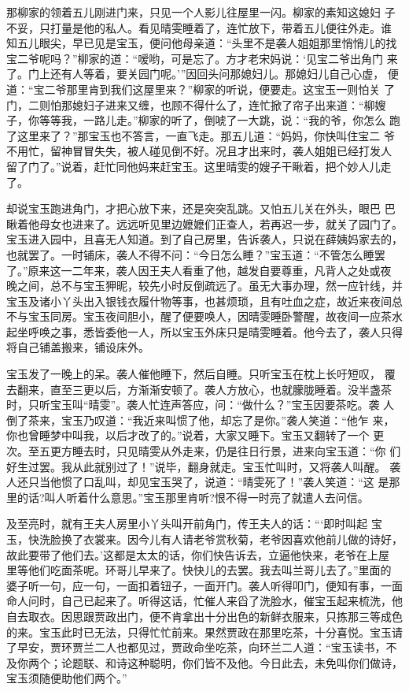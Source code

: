 那柳家的领着五儿刚进门来，只见一个人影儿往屋里一闪。柳家的素知这媳妇
子不妥，只打量是他的私人。看见晴雯睡着了，连忙放下，带着五儿便往外走。谁
知五儿眼尖，早已见是宝玉，便问他母亲道：“头里不是袭人姐姐那里悄悄儿的找
宝二爷呢吗？”柳家的道：“嗳哟，可是忘了。方才老宋妈说：‘见宝二爷出角门
来了。门上还有人等着，要关园门呢。’”因回头问那媳妇儿。那媳妇儿自己心虚，
便道：“宝二爷那里肯到我们这屋里来？”柳家的听说，便要走。这宝玉一则怕关
了门，二则怕那媳妇子进来又缠，也顾不得什么了，连忙掀了帘子出来道：“柳嫂
子，你等等我，一路儿走。”柳家的听了，倒唬了一大跳，说：“我的爷，你怎么
跑了这里来了？”那宝玉也不答言，一直飞走。那五儿道：“妈妈，你快叫住宝二
爷不用忙，留神冒冒失失，被人碰见倒不好。况且才出来时，袭人姐姐已经打发人
留了门了。”说着，赶忙同他妈来赶宝玉。这里晴雯的嫂子干瞅着，把个妙人儿走
了。

却说宝玉跑进角门，才把心放下来，还是突突乱跳。又怕五儿关在外头，眼巴
巴瞅着他母女也进来了。远远听见里边嬷嬷们正查人，若再迟一步，就关了园门了。
宝玉进入园中，且喜无人知道。到了自己房里，告诉袭人，只说在薛姨妈家去的，
也就罢了。一时铺床，袭人不得不问：“今日怎么睡？”宝玉道：“不管怎么睡罢
了。”原来这一二年来，袭人因王夫人看重了他，越发自要尊重，凡背人之处或夜
晚之间，总不与宝玉狎昵，较先小时反倒疏远了。虽无大事办理，然一应针线，并
宝玉及诸小丫头出入银钱衣履什物等事，也甚烦琐，且有吐血之症，故近来夜间总
不与宝玉同房。宝玉夜间胆小，醒了便要唤人，因晴雯睡卧警醒，故夜间一应茶水
起坐呼唤之事，悉皆委他一人，所以宝玉外床只是晴雯睡着。他今去了，袭人只得
将自己铺盖搬来，铺设床外。

宝玉发了一晚上的呆。袭人催他睡下，然后自睡。只听宝玉在枕上长吁短叹，
覆去翻来，直至三更以后，方渐渐安顿了。袭人方放心，也就朦胧睡着。没半盏茶
时，只听宝玉叫“晴雯”。袭人忙连声答应，问：“做什么？”宝玉因要茶吃。袭
人倒了茶来，宝玉乃叹道：“我近来叫惯了他，却忘了是你。”袭人笑道：“他乍
来，你也曾睡梦中叫我，以后才改了的。”说着，大家又睡下。宝玉又翻转了一个
更次。至五更方睡去时，只见晴雯从外走来，仍是往日行景，进来向宝玉道：“你
们好生过罢。我从此就别过了！”说毕，翻身就走。宝玉忙叫时，又将袭人叫醒。
袭人还只当他惯了口乱叫，却见宝玉哭了，说道：“晴雯死了！”袭人笑道：“这
是那里的话?叫人听着什么意思。”宝玉那里肯听?恨不得一时亮了就遣人去问信。

及至亮时，就有王夫人房里小丫头叫开前角门，传王夫人的话：“‘即时叫起
宝玉，快洗脸换了衣裳来。因今儿有人请老爷赏秋菊，老爷因喜欢他前儿做的诗好，
故此要带了他们去。’这都是太太的话，你们快告诉去，立逼他快来，老爷在上屋
里等他们吃面茶呢。环哥儿早来了。快快儿的去罢。我去叫兰哥儿去了。”里面的
婆子听一句，应一句，一面扣着钮子，一面开门。袭人听得叩门，便知有事，一面
命人问时，自己已起来了。听得这话，忙催人来舀了洗脸水，催宝玉起来梳洗，他
自去取衣。因思跟贾政出门，便不肯拿出十分出色的新鲜衣服来，只拣那三等成色
的来。宝玉此时已无法，只得忙忙前来。果然贾政在那里吃茶，十分喜悦。宝玉请
了早安，贾环贾兰二人也都见过，贾政命坐吃茶，向环兰二人道：“宝玉读书，不
及你两个；论题联、和诗这种聪明，你们皆不及他。今日此去，未免叫你们做诗，
宝玉须随便助他们两个。”


